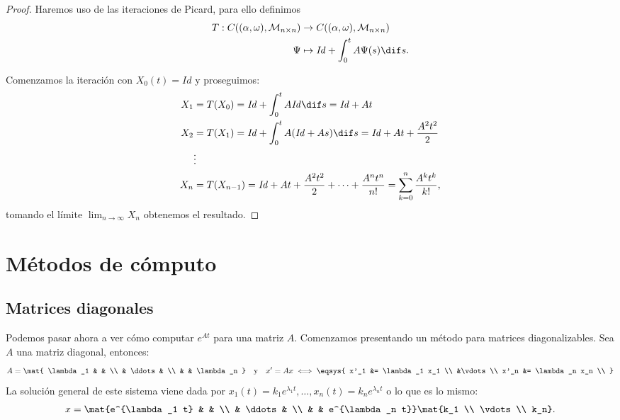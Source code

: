\documentclass[../ecuaciones_diferenciales.tex]{subfiles}
\begin{document}
\begin{proof}
	Haremos uso de las iteraciones de Picard, para ello definimos
	\begin{align*}
		T : C((\alpha, \omega), \mathcal{M}_{n \times n}) &\to 
			C((\alpha, \omega), \mathcal{M}_{n \times n}) \\
		\Psi &\mapsto \mathit{Id} + \int_0^t A \Psi(s) \dif s.
	\end{align*}

	Comenzamos la iteración con \(X_0(t) = \mathit{Id}\) y proseguimos:
	\begin{align*}
		X_1 &= T(X_0) = \mathit{Id} + \int_0^t A \mathit{Id} \dif s = 
			\mathit{Id} + At \\
		X_2 &= T(X_1) = \mathit{Id} + \int_0^t A (\mathit{Id} + As) \dif s = 
			\mathit{Id} + At + \frac{A^2 t^2}{2} \\
		&\vdots \\
		X_n &= T(X_{n - 1}) =
			\mathit{Id} + At + \frac{A^2 t^2}{2} + \cdots + \frac{A^n t^n}{n!}
			= \sum_{k = 0}^n \frac{A^k t^k}{k!},
	\end{align*}
	tomando el límite \(\lim_{n \to \infty} X_n\) obtenemos el resultado.
\end{proof}

\section{Métodos de cómputo}

\subsection{Matrices diagonales}

Podemos pasar ahora a ver cómo computar \(e^{At}\) para una matriz \(A\).
Comenzamos presentando un método para matrices diagonalizables. Sea \(A\) una
matriz diagonal, entonces:
\[A = \mat{
	\lambda_1 & & \\
	& \ddots & \\
	& & \lambda_n
	}
	\quad \text{y} \quad
	x' = Ax \iff
	\eqsys{
		x'_1 &= \lambda_1 x_1 \\
		&\vdots \\
		x'_n &= \lambda_n x_n \\
		}
	\]
La solución general de este sistema viene dada por 
\(x_1(t) = k_1 e^{\lambda_1 t}, \dots, x_n(t) = k_n e^{\lambda_n t}\) o lo que es
lo mismo:
\[x = \mat{e^{\lambda_1 t} & & \\ & \ddots & \\ & & e^{\lambda_n t}} 
	\mat{k_1 \\ \vdots \\ k_n}.\]
\end{document}

